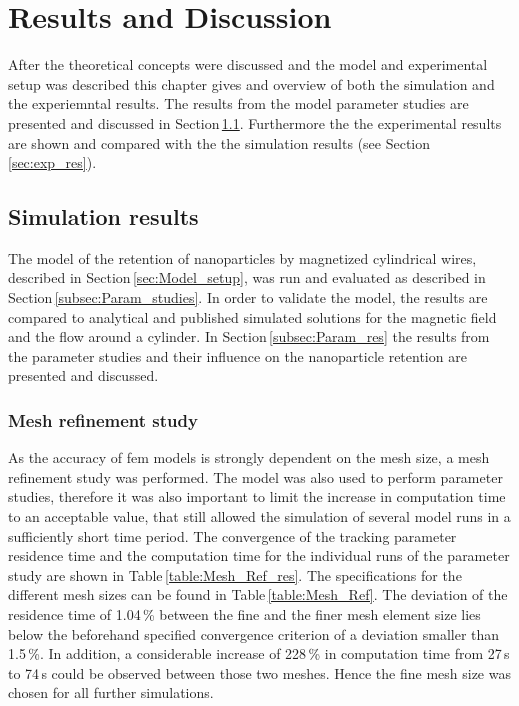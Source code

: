 

\chapter{Results and Discussion}
\label{chap:chap_res}
After the theoretical concepts were discussed and the model and experimental setup was described this chapter gives and overview of both the simulation and the experiemntal results. The results from the model parameter studies are presented and discussed in Section\,\ref{sec:sim_res}. Furthermore the the experimental results are shown and compared with the the simulation results (see Section\,\ref{sec:exp_res}). 

\section{Simulation results}
\label{sec:sim_res}
The model of the retention of nanoparticles by magnetized cylindrical wires, described in Section\,\ref{sec:Model_setup}, was run and evaluated as described in Section\,\ref{subsec:Param_studies}. In order to validate the model, the results are compared to analytical and published simulated solutions for the magnetic field and the flow around a cylinder. In Section\,\ref{subsec:Param_res} the results from the parameter studies and their influence on the nanoparticle retention are presented and discussed.  

\subsection{Mesh refinement study}
\label{subsec:mesh_ref}
As the accuracy of \gls{fem} models is strongly dependent on the mesh size, a mesh refinement study was performed. The model was also used to perform parameter studies, therefore it was also important to limit the increase in computation time to an acceptable value, that still allowed the simulation of several model runs in a sufficiently short time period. The convergence of the tracking parameter residence time and the computation time for the individual runs of the parameter study are shown in Table\,\ref{table:Mesh_Ref_res}. The specifications for the different mesh sizes can be found in Table\,\ref{table:Mesh_Ref}. The deviation of the residence time of 1.04\,\% between the fine and the finer mesh element size lies below the beforehand specified convergence criterion of a deviation smaller than 1.5\,\%. In addition, a considerable increase of 228\,\% in computation time from 27\,s to 74\,s could be observed between those two meshes. Hence the fine mesh size was chosen for all further simulations. 

